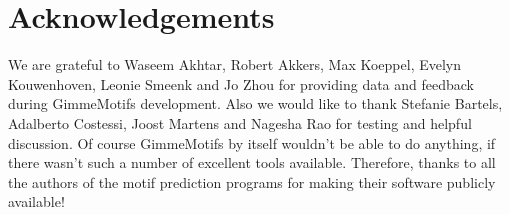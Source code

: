 \documentclass[10pt]{article}
\begin{document}

\section{Acknowledgements}
We are grateful to Waseem Akhtar, Robert Akkers, Max Koeppel, Evelyn Kouwenhoven, Leonie Smeenk and Jo Zhou for providing data and feedback during GimmeMotifs development. Also we would like to thank Stefanie Bartels, Adalberto Costessi, Joost Martens and Nagesha Rao for testing and helpful discussion.
Of course GimmeMotifs by itself wouldn't be able to do anything, if there wasn't such a number of excellent tools available. Therefore, thanks to all the authors of the motif prediction programs for making their software publicly available!


\end{document}
